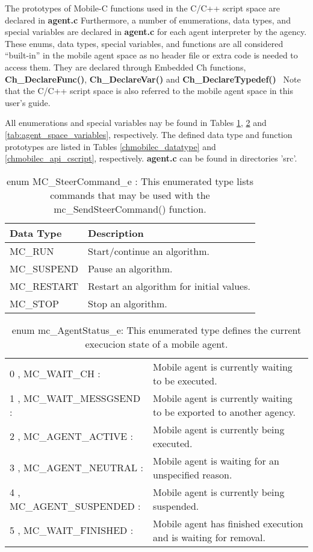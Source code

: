 \noindent
The prototypes of Mobile-C functions used in the C/C++ script space are 
declared in {\bf agent.c} 
Furthermore, a number of enumerations, data types, and special variables are 
declared in {\bf agent.c} for each agent interpreter by the agency. 
These enums, data types, special variables, and functions are all considered 
``built-in'' in the mobile agent space as no header file or extra code is 
needed to access them. 
They are declared through Embedded Ch functions, 
{\bf Ch\_DeclareFunc()}, {\bf Ch\_DeclareVar()} and 
{\bf Ch\_DeclareTypedef()}~\cite{EmbeddedCh}
Note that the C/C++ script space is also referred to the mobile agent space 
in this user's guide.

All enumerations and special variables nay be found in Tables
\ref{tab:agent_space_enums}, \ref{tab:agent_status_enums} 
and \ref{tab:agent_space_variables}, respectively.
The defined data type and function prototypes are listed in 
Tables \ref{chmobilec_datatype} and \ref{chmobilec_api_cscript}, respectively. 
{\bf agent.c} can be found in directories 'src'. 
\begin{table}[p]
\capstart
\begin{center}
\caption{enum MC\_SteerCommand\_e : This enumerated type lists commands that may
  be used with the mc\_SendSteerCommand() function.}
\begin{tabular}{p{50 mm}p{110 mm}}
\hline
Data Type & Description \\
\hline
MC\_RUN \index{MC\_RUN} & Start/continue an algorithm. \\
MC\_SUSPEND \index{MC\_SUSPEND}& Pause an algorithm. \\
MC\_RESTART \index{MC\_RESTART}& Restart an algorithm for initial values. \\
MC\_STOP \index{MC\_STOP}& Stop an algorithm.\\
\hline
\end{tabular}
\end{center}
\label{tab:agent_space_enums}
\end{table}
\begin{table}[p]
\capstart
\begin{center}
\caption{enum mc\_AgentStatus\_e: This enumerated type defines the current execucion
  state of a mobile agent.}
\begin{tabular}{p{55 mm}p{120 mm}}
0 , MC\_WAIT\_CH : & Mobile agent is currently waiting to be executed.\\
1 , MC\_WAIT\_MESSGSEND : & Mobile agent is currently waiting to be exported to another agency.\\
2 , MC\_AGENT\_ACTIVE : & Mobile agent is currently being executed.\\
3 , MC\_AGENT\_NEUTRAL : & Mobile agent is waiting for an unspecified reason.\\
4 , MC\_AGENT\_SUSPENDED : & Mobile agent is currently being suspended.\\
5 , MC\_WAIT\_FINISHED : & Mobile agent has finished execution and is waiting for removal.
\end{tabular}
\end{center}
\label{tab:agent_status_enums}
\end{table}

